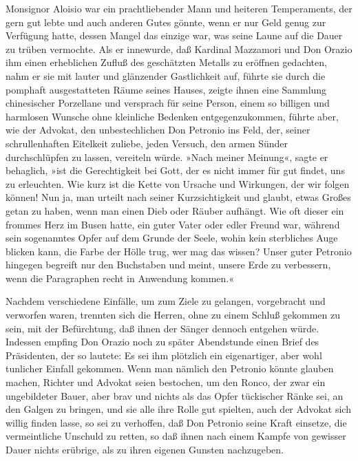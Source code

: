 Monsignor Aloisio war ein prachtliebender Mann und heiteren
Temperaments, der gern gut lebte und auch anderen Gutes gönnte,
wenn er nur Geld genug zur Verfügung hatte, dessen Mangel das
einzige war, was seine Laune auf die Dauer zu trüben vermochte. Als
er innewurde, daß Kardinal Mazzamori und Don Orazio ihm einen
erheblichen Zufluß des geschätzten Metalls zu eröffnen gedachten,
nahm er sie mit lauter und glänzender Gastlichkeit auf, führte sie
durch die pomphaft ausgestatteten Räume seines Hauses, zeigte ihnen
eine Sammlung chinesischer Porzellane und versprach für seine
Person, einem so billigen und harmlosen Wunsche ohne kleinliche
Bedenken entgegenzukommen, führte aber, wie der Advokat, den
unbestechlichen Don Petronio ins Feld, der, seiner schrullenhaften
Eitelkeit zuliebe, jeden Versuch, den armen Sünder\pagenum{[74]}
durchschlüpfen zu lassen, vereiteln würde. »Nach meiner Meinung«,
sagte er behaglich, »ist die Gerechtigkeit bei Gott, der es nicht
immer für gut findet, uns zu erleuchten. Wie kurz ist die Kette von
Ursache und Wirkungen, der wir folgen können! Nun ja, man urteilt
nach seiner Kurzsichtigkeit und glaubt, etwas Großes getan zu
haben, wenn man einen Dieb oder Räuber aufhängt. Wie oft dieser ein
frommes Herz im Busen hatte, ein guter Vater oder edler Freund war,
während sein sogenanntes Opfer auf dem Grunde der Seele, wohin kein
sterbliches Auge blicken kann, die Farbe der Hölle trug, wer mag
das wissen? Unser guter Petronio hingegen begreift nur den
Buchstaben und meint, unsere Erde zu verbessern, wenn die
Paragraphen recht in Anwendung kommen.«

Nachdem verschiedene Einfälle, um zum Ziele zu gelangen,
vorgebracht und verworfen waren, trennten sich die Herren, ohne zu
einem Schluß gekommen zu sein, mit der Befürchtung, daß ihnen der
Sänger dennoch entgehen würde. Indessen empfing Don Orazio noch zu
später Abendstunde einen Brief des Präsidenten, der so lautete: Es
sei ihm plötzlich ein eigenartiger, aber wohl tunlicher Einfall
gekommen. Wenn man nämlich den Petronio könnte glauben machen,
Richter und Advokat seien bestochen, um den Ronco, der zwar ein
ungebildeter Bauer, aber brav und nichts als das Opfer tückischer
Ränke sei, an den Galgen zu bringen, und sie alle ihre Rolle gut
spielten, auch der Advokat sich willig finden lasse, so sei zu
verhoffen, daß Don Petronio seine Kraft einsetze, die vermeintliche
Unschuld zu retten, so daß ihnen nach einem Kampfe von gewisser
Dauer nichts erübrige, als zu ihren eigenen Gunsten nachzugeben.

